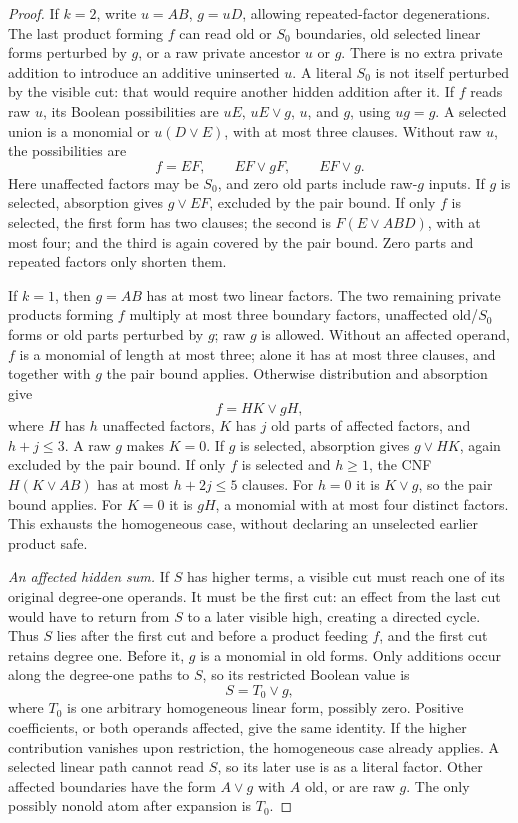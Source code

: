 \documentclass[11pt]{article}
\theoremstyle{definition}
\theoremstyle{remark}
\begin{document}
\begin{proof}
If $k=2$, write $u=AB$, $g=uD$, allowing repeated-factor degenerations.
The last product forming $f$ can read old or $S_0$ boundaries, old selected
linear forms perturbed by $g$, or a raw private ancestor $u$ or $g$.
There is no extra private addition to introduce an additive uninserted
$u$. A literal $S_0$ is not itself perturbed by the visible cut: that would
require another hidden addition after it.
If $f$ reads raw $u$, its Boolean possibilities are
$uE$, $uE\vee g$, $u$, and $g$, using $ug=g$.
A selected union is a monomial or $u(D\vee E)$, with at most three clauses.
Without raw $u$, the possibilities are
\[
 f=EF,\qquad EF\vee gF,\qquad EF\vee g.
\]
Here unaffected factors may be $S_0$, and zero old parts include raw-$g$
inputs. If $g$ is selected, absorption gives $g\vee EF$, excluded by the
pair bound. If only $f$ is selected, the first form has two clauses; the
second is $F(E\vee ABD)$, with at most four; and the third is again covered
by the pair bound. Zero parts and repeated factors only shorten them.

If $k=1$, then $g=AB$ has at most two linear factors. The two remaining
private products forming $f$ multiply at most three boundary factors,
unaffected old/$S_0$ forms or old parts perturbed by $g$; raw $g$ is allowed.
Without an affected operand, $f$ is a monomial of length at most three;
alone it has at most three clauses, and together with $g$ the pair bound
applies. Otherwise distribution and absorption give
\[
 f=HK\vee gH,
\]
where $H$ has $h$ unaffected factors, $K$ has $j$ old parts of affected
factors, and $h+j\le3$. A raw $g$ makes $K=0$.
If $g$ is selected, absorption gives $g\vee HK$, again excluded by the
pair bound. If only $f$ is selected and $h\ge1$, the CNF
$H(K\vee AB)$ has at most $h+2j\le5$ clauses.
For $h=0$ it is $K\vee g$, so the pair bound applies. For $K=0$ it is
$gH$, a monomial with at most four distinct factors. This exhausts the
homogeneous case, without declaring an unselected earlier product safe.

\emph{An affected hidden sum.} If $S$ has higher terms, a visible cut must
reach one of its original degree-one operands. It must be the first cut:
an effect from the last cut would have to return from $S$ to a later visible
high, creating a directed cycle. Thus $S$ lies after the first cut and
before a product feeding $f$, and the first cut retains degree one.
Before it, $g$ is a monomial in old forms. Only additions occur along the
degree-one paths to $S$, so its restricted Boolean value is
\[
 S=T_0\vee g,
\]
where $T_0$ is one arbitrary homogeneous linear form, possibly zero.
Positive coefficients, or both operands affected, give the same identity.
If the higher contribution vanishes upon restriction, the homogeneous case
already applies. A selected linear path cannot read $S$, so its later use
is as a literal factor. Other affected boundaries have the form $A\vee g$
with $A$ old, or are raw $g$. The only possibly nonold atom after expansion
is $T_0$.


\end{proof}
\end{document}
